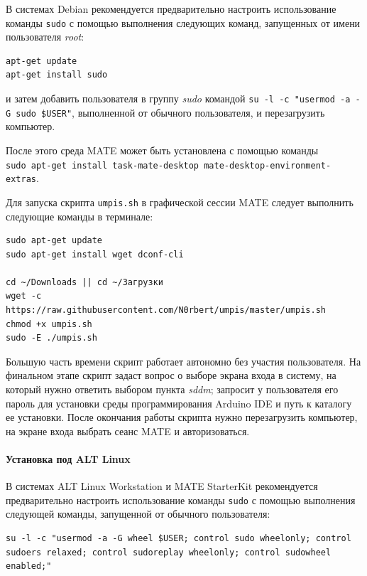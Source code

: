 \documentclass[
  a4paper,
]{book}
\theoremstyle{definition}
\theoremstyle{definition}
\theoremstyle{definition}
\theoremstyle{definition}
\theoremstyle{remark}
\begin{document}
В системах Debian рекомендуется предварительно настроить использование команды \texttt{sudo} с помощью выполнения следующих команд, запущенных от имени пользователя \emph{root}:

\begin{verbatim}
apt-get update
apt-get install sudo
\end{verbatim}

и затем добавить пользователя в группу \emph{sudo} командой \texttt{su\ -l\ -c\ "usermod\ -a\ -G\ sudo\ \$USER"}, выполненной от обычного пользователя, и перезагрузить компьютер.

После этого среда MATE может быть установлена с помощью команды \texttt{sudo\ apt-get\ install\ task-mate-desktop\ mate-desktop-environment-extras}.

Для запуска скрипта \texttt{umpis.sh} в графической сессии MATE следует выполнить следующие команды в терминале:

\begin{verbatim}
sudo apt-get update
sudo apt-get install wget dconf-cli

cd ~/Downloads || cd ~/Загрузки
wget -c https://raw.githubusercontent.com/N0rbert/umpis/master/umpis.sh
chmod +x umpis.sh
sudo -E ./umpis.sh
\end{verbatim}

Большую часть времени скрипт работает автономно без участия пользователя. На финальном этапе скрипт задаст вопрос о выборе экрана входа в систему, на который нужно ответить выбором пункта \emph{sddm}; запросит у пользователя его пароль для установки среды программирования Arduino IDE и путь к каталогу ее установки. После окончания работы скрипта нужно перезагрузить компьютер, на экране входа выбрать сеанс MATE и авторизоваться.

\paragraph{Установка под ALT Linux}\label{software-r-linux-alt}

В системах ALT Linux Workstation и MATE StarterKit рекомендуется предварительно настроить использование команды \texttt{sudo} с помощью выполнения следующей команды, запущенной от обычного пользователя:

\begin{verbatim}
su -l -c "usermod -a -G wheel $USER; control sudo wheelonly; control sudoers relaxed; control sudoreplay wheelonly; control sudowheel enabled;"
\end{verbatim}
\end{document}
